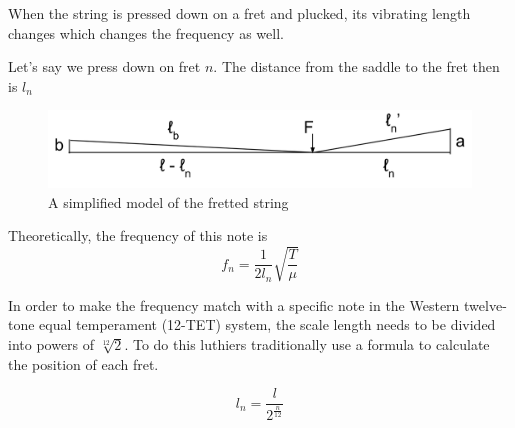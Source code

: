 When the string is pressed down on a fret and plucked, its vibrating length changes which  changes the frequency as well.\par
Let's say we press down on fret $n$. The distance from the saddle to the fret then is $l_n$

\begin{figure}[!ht]
    \includegraphics[width=\textwidth]{./ee/fig3.png}
    \caption{A simplified model of the fretted string}\label{fig3}
\end{figure} 

Theoretically, the frequency of this note is 
\begin{equation}\label{eqn5}
    f_n = \frac{1}{2l_n}\sqrt{\frac{T}{\mu}}
\end{equation}

In order to make the frequency match with a specific note in the Western twelve-tone equal temperament (12-TET) system, the scale length needs to be divided into powers of $\sqrt[12]{2}$. To do this luthiers traditionally use a formula to calculate the position of each fret. \cite{eqn6}

\begin{equation}\label{eqn6}
    l_n=\frac{l}{2^\frac{n}{12}}
\end{equation}
